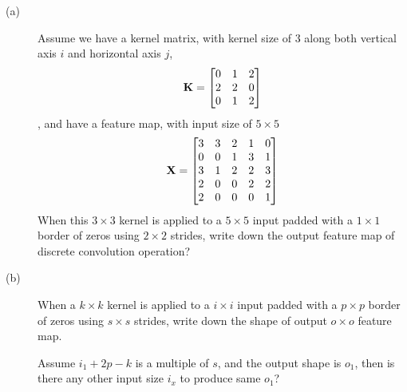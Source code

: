 \documentclass[12pt]{article}
\begin{document}
\begin{description}
	\item[(a)]
	      Assume we have a kernel matrix, with kernel size of $3$ along both vertical axis $i$ and horizontal axis $j$,
	      $$\mathbf{K} = \begin{bmatrix}
			      0 & 1 & 2 \\
			      2 & 2 & 0 \\
			      0 & 1 & 2
		      \end{bmatrix}$$, and have a feature map, with input size of $5\times 5$
	      $$\mathbf{X} =  \begin{bmatrix}
			      3 & 3 & 2 & 1 & 0 \\
			      0 & 0 & 1 & 3 & 1 \\
			      3 & 1 & 2 & 2 & 3 \\
			      2 & 0 & 0 & 2 & 2 \\
			      2 & 0 & 0 & 0 & 1
		      \end{bmatrix}$$
	      When this $3\times 3$ kernel is applied  to a $5 \times 5$ input padded with a $1 \times 1$ border of zeros using $2 \times 2$ strides, write down the output feature map of discrete convolution operation?
	\item[(b)] When a $k\times k$ kernel is applied  to a $i \times i$ input padded with a $p \times p$ border of zeros using $s \times s$ strides, write down the shape of output $o \times o$ feature map.

	      Assume $i_1+2p-k$ is a multiple of $s$, and the output shape is $o_1$, then is there any other input size $i_x$ to produce same $o_1$?


\end{description}
\end{document}
